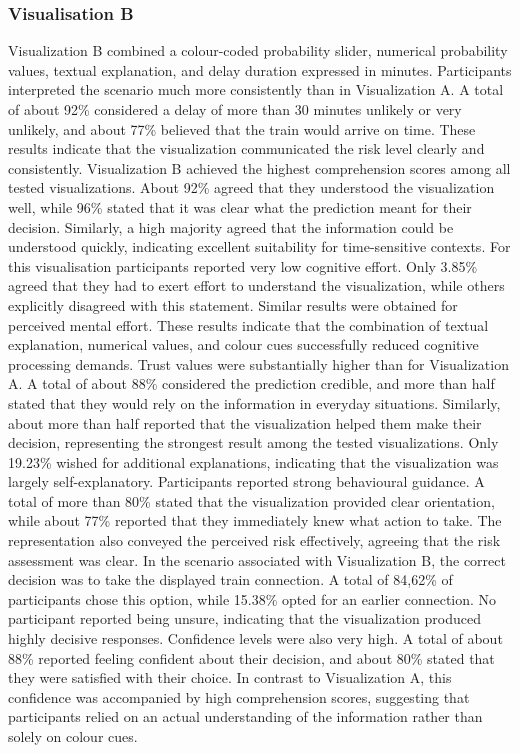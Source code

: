 \documentclass[final,journal,a4paper]{IEEEtran}
\begin{document}
\subsubsection{Visualisation B}
Visualization B combined a colour-coded probability slider, numerical probability values, textual explanation, and delay duration expressed in minutes. Participants interpreted the scenario much more consistently than in Visualization A. A total of about 92\% considered a delay of more than 30 minutes unlikely or very unlikely, and about 77\% believed that the train would arrive on time. These results indicate that the visualization communicated the risk level clearly and consistently. Visualization B achieved the highest comprehension scores among all tested visualizations. About 92\% agreed that they understood the visualization well, while 96\% stated that it was clear what the prediction meant for their decision. Similarly, a high majority agreed that the information could be understood quickly, indicating excellent suitability for time-sensitive contexts. For this visualisation participants reported very low cognitive effort. Only 3.85\% agreed that they had to exert effort to understand the visualization, while others explicitly disagreed with this statement. Similar results were obtained for perceived mental effort. These results indicate that the combination of textual explanation, numerical values, and colour cues successfully reduced cognitive processing demands. Trust values were substantially higher than for Visualization A. A total of about 88\% considered the prediction credible, and more than half stated that they would rely on the information in everyday situations. Similarly, about more than half reported that the visualization helped them make their decision, representing the strongest result among the tested visualizations. Only 19.23\% wished for additional explanations, indicating that the visualization was largely self-explanatory. Participants reported strong behavioural guidance. A total of more than 80\% stated that the visualization provided clear orientation, while about 77\% reported that they immediately knew what action to take. The representation also conveyed the perceived risk effectively, agreeing that the risk assessment was clear. In the scenario associated with Visualization B, the correct decision was to take the displayed train connection. A total of 84,62\% of participants chose this option, while 15.38\% opted for an earlier connection. No participant reported being unsure, indicating that the visualization produced highly decisive responses. Confidence levels were also very high. A total of about 88\% reported feeling confident about their decision, and about 80\% stated that they were satisfied with their choice. In contrast to Visualization A, this confidence was accompanied by high comprehension scores, suggesting that participants relied on an actual understanding of the information rather than solely on colour cues.
\end{document}
